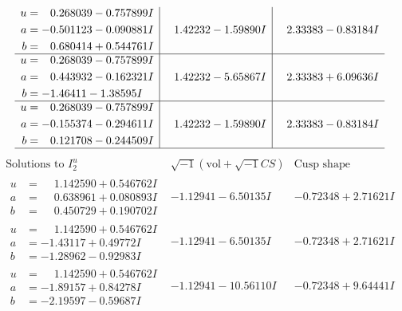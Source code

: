 \documentclass[1p]{elsarticle_modified}
\theoremstyle{definition}
\newcommand{\I}{\sqrt{-1}}
\begin{document}
$$\begin{array}{c|c|c}
\begin{aligned}
u &= \phantom{-}0.268039 - 0.757899 I \\
a &= -0.501123 - 0.090881 I \\
b &= \phantom{-}0.680414 + 0.544761 I\end{aligned}
 & \phantom{-}1.42232 - 1.59890 I & \phantom{-}2.33383 - 0.83184 I \\ \hline\begin{aligned}
u &= \phantom{-}0.268039 - 0.757899 I \\
a &= \phantom{-}0.443932 - 0.162321 I \\
b &= -1.46411 - 1.38595 I\end{aligned}
 & \phantom{-}1.42232 - 5.65867 I & \phantom{-}2.33383 + 6.09636 I \\ \hline\begin{aligned}
u &= \phantom{-}0.268039 - 0.757899 I \\
a &= -0.155374 - 0.294611 I \\
b &= \phantom{-}0.121708 - 0.244509 I\end{aligned}
 & \phantom{-}1.42232 - 1.59890 I & \phantom{-}2.33383 - 0.83184 I\\
 \hline 
 \end{array}$$\newpage$$\begin{array}{c|c|c}  
\text{Solutions to }I^u_{2}& \I (\text{vol} + \sqrt{-1}CS) & \text{Cusp shape}\\
 \hline 
\begin{aligned}
u &= \phantom{-}1.142590 + 0.546762 I \\
a &= \phantom{-}0.638961 + 0.080893 I \\
b &= \phantom{-}0.450729 + 0.190702 I\end{aligned}
 & -1.12941 - 6.50135 I & -0.72348 + 2.71621 I \\ \hline\begin{aligned}
u &= \phantom{-}1.142590 + 0.546762 I \\
a &= -1.43117 + 0.49772 I \\
b &= -1.28962 - 0.92983 I\end{aligned}
 & -1.12941 - 6.50135 I & -0.72348 + 2.71621 I \\ \hline\begin{aligned}
u &= \phantom{-}1.142590 + 0.546762 I \\
a &= -1.89157 + 0.84278 I \\
b &= -2.19597 - 0.59687 I\end{aligned}
 & -1.12941 - 10.56110 I & -0.72348 + 9.64441 I \\ \hline\begin{aligned}

\end{aligned}
\end{array}$$
\end{document}
